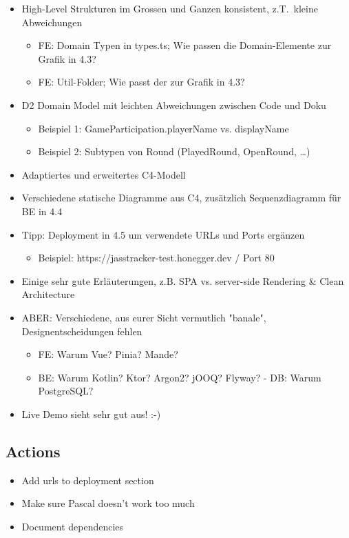 \begin{itemize}
    \item High-Level Strukturen im Grossen und Ganzen konsistent, z.T.\ kleine Abweichungen
    \begin{itemize}
        \item FE: Domain Typen in types.ts; Wie passen die Domain-Elemente zur Grafik in 4.3?
        \item FE: Util-Folder; Wie passt der zur Grafik in 4.3?
    \end{itemize}
    \item D2 Domain Model mit leichten Abweichungen zwischen Code und Doku
    \begin{itemize}
        \item Beispiel 1: GameParticipation.playerName vs. displayName
        \item Beispiel 2: Subtypen von Round (PlayedRound, OpenRound, \ldots)
    \end{itemize}
    \item Adaptiertes und erweitertes C4-Modell
    \item Verschiedene statische Diagramme aus C4, zusätzlich Sequenzdiagramm für BE in 4.4
    \item Tipp: Deployment in 4.5 um verwendete URLs und Ports ergänzen
    \begin{itemize}
        \item Beispiel: https://jasstracker-test.honegger.dev / Port 80
    \end{itemize}
    \item Einige sehr gute Erläuterungen, z.B. SPA vs. server-side Rendering \& Clean Architecture
    \item ABER: Verschiedene, aus eurer Sicht vermutlich "banale", Designentscheidungen fehlen
    \begin{itemize}
        \item FE: Warum Vue? Pinia? Mande?
        \item BE: Warum Kotlin? Ktor? Argon2? jOOQ? Flyway? - DB: Warum PostgreSQL?
    \end{itemize}
    \item Live Demo \textrightarrow sieht sehr gut aus! :-)
\end{itemize}

\subsection{Actions}

\begin{itemize}
    \item Add urls to deployment section
    \item Make sure Pascal doesn't work too much
    \item Document dependencies
\end{itemize}

